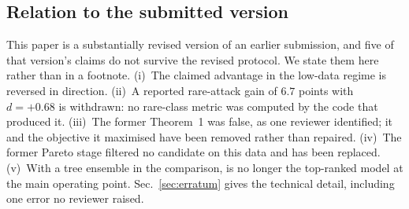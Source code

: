 \subsection*{Relation to the submitted version}
\begin{revbody}

This paper is a substantially revised version of an earlier submission, and five
of that version's claims do not survive the revised protocol. We state them
here rather than in a footnote. (i)~The claimed advantage in the low-data regime
is reversed in direction. (ii)~A reported rare-attack gain of $6.7$ points with
$d=+0.68$ is withdrawn: no rare-class metric was computed by the code that
produced it. (iii)~The former Theorem~1 was false, as one reviewer identified;
it and the objective it maximised have been removed rather than repaired.
(iv)~The former Pareto stage filtered no candidate on this data and has been
replaced. (v)~With a tree ensemble in the comparison, \QSVM{} is no longer the
top-ranked model at the main operating point. Sec.~\ref{sec:erratum} gives the
technical detail, including one error no reviewer raised.
\end{revbody}
